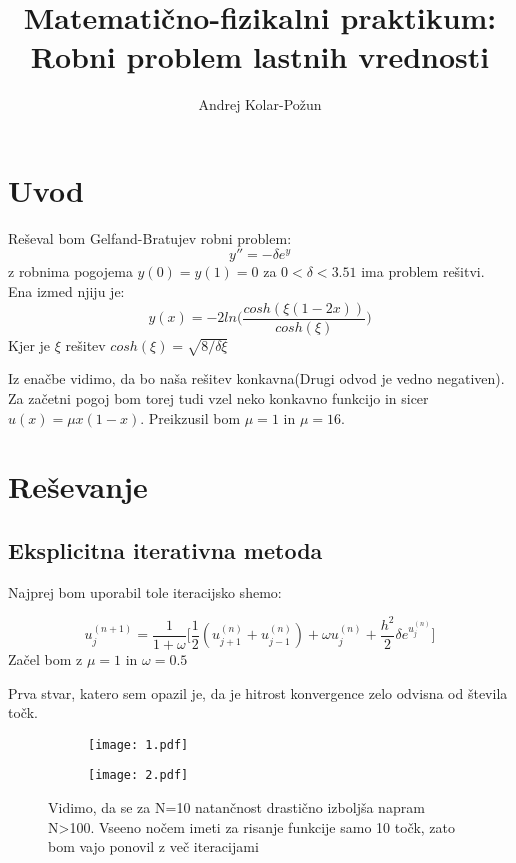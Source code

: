 \documentclass{article}
\title{Matemati{\v c}no-fizikalni praktikum: Robni problem lastnih vrednosti}
\author{Andrej Kolar-Po{\v z}un}
\begin{document}
\maketitle
\newpage
{}

\section{Uvod}

Reševal bom Gelfand-Bratujev robni problem:
\begin{equation*}
y'' = -\delta e^y
\end{equation*}
z robnima pogojema $y(0)=y(1)=0$
za $0 < \delta < 3.51$ ima problem rešitvi. Ena izmed njiju je:
\begin{equation*}
y(x) = -2 ln\Big( \frac{cosh(\xi (1-2x))}{cosh(\xi)}\Big)
\end{equation*}
Kjer je $\xi$ rešitev $cosh(\xi) = \sqrt{8/\delta \xi}$

Iz enačbe vidimo, da bo naša rešitev konkavna(Drugi odvod je vedno negativen). Za začetni pogoj bom torej tudi vzel neko konkavno funkcijo in sicer $u(x) =\mu x(1-x)$. Preikzusil bom 
$\mu = 1$ in $\mu = 16$.

\section{Reševanje}

\subsection{Eksplicitna iterativna metoda}

Najprej bom uporabil tole iteracijsko shemo:

\begin{equation*}
u_j^{(n+1)} = \frac{1}{1+\omega} \Big[ \frac{1}{2}(u_{j+1}^{(n)} + u_{j-1}^{(n)}) + \omega u_j^{(n)} + \frac{h^2}{2}\delta e^{u_j^{(n)}}\Big]
\end{equation*}
Začel bom z $\mu=1$ in $\omega=0.5$

Prva stvar, katero sem opazil je, da je hitrost konvergence zelo odvisna od števila točk.

\begin{figure}[H]
\begin{subfigure}{.5\textwidth}
\texttt{[image: 1.pdf]}
\end{subfigure}
\begin{subfigure}{.5\textwidth}
\texttt{[image: 2.pdf]}
\end{subfigure}
\caption*{Vidimo, da se za N=10 natančnost drastično izboljša napram N>100. Vseeno nočem imeti za risanje funkcije samo 10 točk, zato bom vajo ponovil z več iteracijami}
\end{figure}
\end{document}
